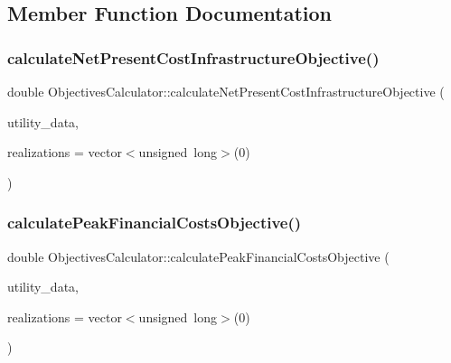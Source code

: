 \subsection{Member Function Documentation}
\mbox{\label{classObjectivesCalculator_a5619e4472f8e96bc6fa274002d4809f1}} 
\subsubsection{\texorpdfstring{calculate\+Net\+Present\+Cost\+Infrastructure\+Objective()}{calculateNetPresentCostInfrastructureObjective()}}
{\footnotesize\ttfamily double Objectives\+Calculator\+::calculate\+Net\+Present\+Cost\+Infrastructure\+Objective (\begin{DoxyParamCaption}\item[{const vector$<$ \mbox{\hyperlink{classUtilitiesDataCollector}{Utilities\+Data\+Collector}} $\ast$$>$ \&}]{utility\+\_\+data,  }\item[{vector$<$ unsigned long $>$}]{realizations = {\ttfamily vector$<$unsigned~long$>$(0)} }\end{DoxyParamCaption})\hspace{0.3cm}{\ttfamily [static]}}

\mbox{\label{classObjectivesCalculator_a2352c178eab40798324120102cc7891b}} 
\subsubsection{\texorpdfstring{calculate\+Peak\+Financial\+Costs\+Objective()}{calculatePeakFinancialCostsObjective()}}
{\footnotesize\ttfamily double Objectives\+Calculator\+::calculate\+Peak\+Financial\+Costs\+Objective (\begin{DoxyParamCaption}\item[{const vector$<$ \mbox{\hyperlink{classUtilitiesDataCollector}{Utilities\+Data\+Collector}} $\ast$$>$ \&}]{utility\+\_\+data,  }\item[{vector$<$ unsigned long $>$}]{realizations = {\ttfamily vector$<$unsigned~long$>$(0)} }\end{DoxyParamCaption})\hspace{0.3cm}{\ttfamily [static]}}

